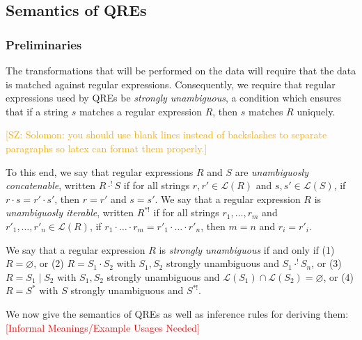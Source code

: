 \documentclass{svproc}
\newcommand{\FINISH}[3]{\ifdraft\textcolor{#1}{[#2: #3]}\fi}
\newcommand{\saz}[1]{\FINISH{orange}{SZ}{#1}}
\newcommand{\sep}{\ensuremath{\; | \;}}
\begin{document}
\subsection{Semantics of QREs}
\subsubsection{Preliminaries}
The transformations that will be performed on the data will require
that the data is matched against regular expressions. Consequently, we require
that regular expressions used by QREs be \textit{strongly unambiguous}, a
condition which ensures that if a string $s$ matches a regular expression $R$,
then $s$ matches $R$ uniquely.

\saz{Solomon: you should use blank lines instead of backslashes to separate
  paragraphs so latex can format them properly.}

To this end, we say that regular expressions $R$ and $S$ are
\textit{unambiguosly concatenable}, written $R \cdot^! S$ if for all strings
$r, r' \in \mathcal{L}(R)$ and $s, s' \in \mathcal{L}(S)$, if $r \cdot s = r'
\cdot s'$, then $r = r'$ and $s = s'$. We say that a regular expression $R$ is
\textit{unambiguosly iterable}, written $R^{*!}$ if for all strings $r_1,
\ldots, r_m$ and $r'_1, \ldots, r'_n \in \mathcal{L}(R)$, if $r_1 \cdot \ldots
\cdot r_m = r'_1 \cdot \ldots \cdot r'_n$, then $m = n$ and $r_i = r'_i$.

We say that a regular expression $R$ is \textit{strongly unambiguous} if and
only if (1) $R = \varnothing$, or (2) $R = S_1 \cdot S_2$ with $S_1, S_2$
strongly unambiguous and $S_1 \cdot^! S_n$, or (3) $R = S_1 \sep S_2$ with
$S_1, S_2$ strongly unambiguous and $\mathcal{L}(S_1) \cap \mathcal{L}(S_2) =
\varnothing$, or (4) $R = S^*$ with $S$ strongly unambiguous and $S^{*!}$.

We now give the semantics of QREs as well as inference rules for deriving them:
\textcolor{red}{[Informal Meanings/Example Usages Needed]}
\end{document}
